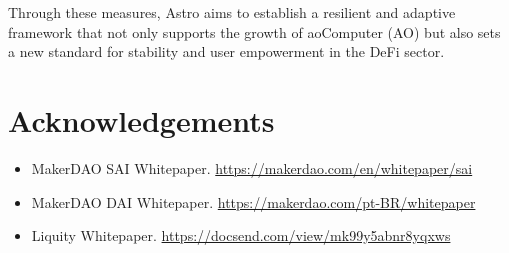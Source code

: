 Through these measures, Astro aims to establish a resilient and adaptive framework that not only supports the growth of aoComputer (AO) but also sets a new standard for stability and user empowerment in the DeFi sector.

\section{Acknowledgements}
\begin{itemize}
    \item MakerDAO SAI Whitepaper. \url{https://makerdao.com/en/whitepaper/sai}
    \item MakerDAO DAI Whitepaper. \url{https://makerdao.com/pt-BR/whitepaper}
    \item Liquity Whitepaper. \url{https://docsend.com/view/mk99y5abnr8yqxws}
\end{itemize}